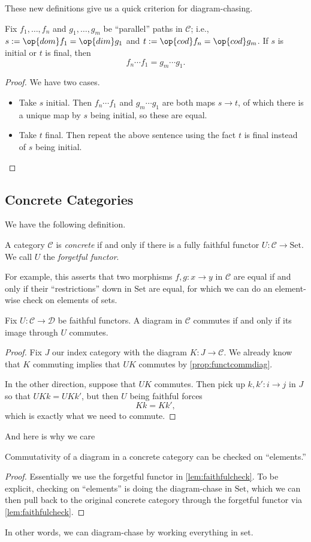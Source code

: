 \documentclass[../notes.tex]{subfiles}
\begin{document}
These new definitions give us a quick criterion for diagram-chasing.
\begin{lemma}
	Fix $f_1,\ldots,f_n$ and $g_1,\ldots,g_m$ be ``parallel'' paths in $\mathcal C$; i.e., $s:=\op{dom}f_1=\op{dim}g_1$ and $t:=\op{cod}f_n=\op{cod}g_m$. If $s$ is initial or $t$ is final, then
	\[f_n\cdots f_1=g_m\cdots g_1.\]
\end{lemma}
\begin{proof}
	We have two cases.
	\begin{itemize}
		\item Take $s$ initial. Then $f_n\cdots f_1$ and $g_m\cdots g_1$ are both maps $s\to t$, of which there is a unique map by $s$ being initial, so these are equal.
		\item Take $t$ final. Then repeat the above sentence using the fact $t$ is final instead of $s$ being initial.
		\qedhere
	\end{itemize}
\end{proof}

\subsection{Concrete Categories}
We have the following definition.
\begin{definition}[Concrete]
	A category $\mathcal C$ is \textit{concrete} if and only if there is a fully faithful functor $U:\mathcal C\to\mathrm{Set}$. We call $U$ the \textit{forgetful functor}.
\end{definition}
For example, this asserts that two morphisms $f,g:x\to y$ in $\mathcal C$ are equal if and only if their ``restrictions'' down in $\mathrm{Set}$ are equal, for which we can do an element-wise check on elements of sets.
\begin{lemma} \label{lem:faithfulcheck}
	Fix $U:\mathcal C\to\mathcal D$ be faithful functors. A diagram in $\mathcal C$ commutes if and only if its image through $U$ commutes.
\end{lemma}
\begin{proof}
	Fix $J$ our index category with the diagram $K:J\to\mathcal C$. We already know that $K$ commuting implies that $UK$ commutes by \autoref{prop:functcommdiag}.

	In the other direction, suppose that $UK$ commutes. Then pick up $k,k':i\to j$ in $J$ so that $UKk=UKk'$, but then $U$ being faithful forces
	\[Kk=Kk',\]
	which is exactly what we need to commute.
\end{proof}
And here is why we care
\begin{corollary}
	Commutativity of a diagram in a concrete category can be checked on ``elements.''
\end{corollary}
\begin{proof}
	Essentially we use the forgetful functor in \autoref{lem:faithfulcheck}. To be explicit, checking on ``elements'' is doing the diagram-chase in $\mathrm{Set}$, which we can then pull back to the original concrete category through the forgetful functor via \autoref{lem:faithfulcheck}.
\end{proof}
In other words, we can diagram-chase by working everything in set.
\end{document}
